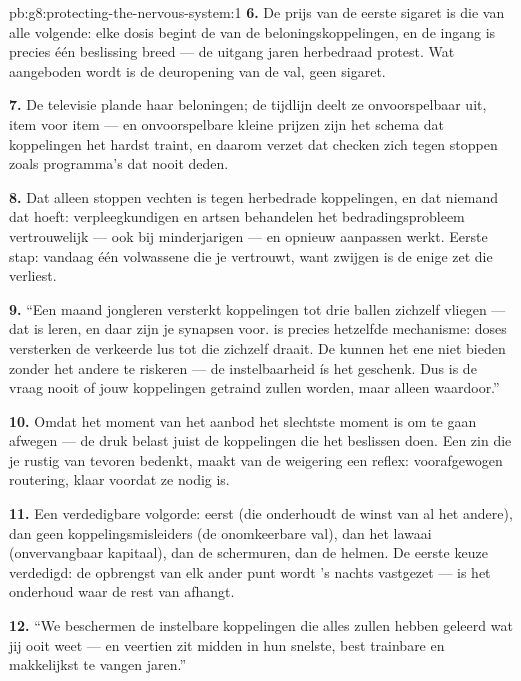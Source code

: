 \begin{solution}{pb:g8:protecting-the-nervous-system:1}
\textbf{6.} De prijs van de eerste sigaret is die van alle volgende: elke
dosis begint de  van de beloningskoppelingen, en de ingang is
precies één beslissing breed --- de uitgang jaren herbedraad protest. Wat
aangeboden wordt is de deuropening van de val, geen sigaret.

\textbf{7.} De televisie plande haar beloningen; de tijdlijn deelt ze
onvoorspelbaar uit, item voor item --- en onvoorspelbare kleine prijzen
zijn het schema dat koppelingen het hardst traint, en daarom verzet dat
checken zich tegen stoppen zoals programma's dat nooit deden.

\textbf{8.} Dat alleen stoppen vechten is tegen herbedrade koppelingen, en
dat niemand dat hoeft: verpleegkundigen en artsen behandelen het
bedradingsprobleem vertrouwelijk --- ook bij minderjarigen --- en opnieuw
aanpassen werkt. Eerste stap: vandaag één volwassene die je vertrouwt,
want zwijgen is de enige zet die verliest.

\textbf{9.} ``Een maand jongleren versterkt koppelingen tot drie ballen
zichzelf vliegen --- dat is leren, en daar zijn je synapsen voor.
 is precies hetzelfde mechanisme: doses versterken de verkeerde
lus tot die zichzelf draait. De  kunnen het ene niet bieden zonder
het andere te riskeren --- de instelbaarheid ís het geschenk. Dus is de
vraag nooit of jouw koppelingen getraind zullen worden, maar alleen
waardoor.''

\textbf{10.} Omdat het moment van het aanbod het slechtste moment is om te
gaan afwegen --- de druk belast juist de koppelingen die het beslissen
doen. Een zin die je rustig van tevoren bedenkt, maakt van de weigering een
reflex: voorafgewogen routering, klaar voordat ze nodig is.

\textbf{11.} Een verdedigbare volgorde:  eerst (die onderhoudt de
winst van al het andere), dan geen koppelingsmisleiders (de onomkeerbare
val), dan het lawaai (onvervangbaar kapitaal), dan de schermuren, dan de
helmen. De eerste keuze verdedigd: de opbrengst van elk ander punt wordt
's nachts vastgezet ---  is het onderhoud waar de rest van afhangt.

\textbf{12.} ``We beschermen de instelbare koppelingen die alles zullen
hebben geleerd wat jij ooit weet --- en veertien zit midden in hun
snelste, best trainbare en makkelijkst te vangen jaren.''
\end{solution}
